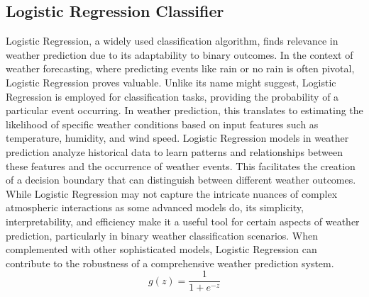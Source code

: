 \documentclass[conference, onecolumn]{IEEEtran}
\begin{document}
\subsection{\textbf{Logistic Regression Classifier}}
Logistic Regression, a widely used classification algorithm, finds relevance in weather prediction due to its adaptability to binary outcomes. In the context of weather forecasting, where predicting events like rain or no rain is often pivotal, Logistic Regression proves valuable. Unlike its name might suggest, Logistic Regression is employed for classification tasks, providing the probability of a particular event occurring. In weather prediction, this translates to estimating the likelihood of specific weather conditions based on input features such as temperature, humidity, and wind speed. Logistic Regression models in weather prediction analyze historical data to learn patterns and relationships between these features and the occurrence of weather events. This facilitates the creation of a decision boundary that can distinguish between different weather outcomes. While Logistic Regression may not capture the intricate nuances of complex atmospheric interactions as some advanced models do, its simplicity, interpretability, and efficiency make it a useful tool for certain aspects of weather prediction, particularly in binary weather classification scenarios. When complemented with other sophisticated models, Logistic Regression can contribute to the robustness of a comprehensive weather prediction system.
\\ \[ g(z) = \frac{1}{1 + e^{-z}} \]
\end{document}
